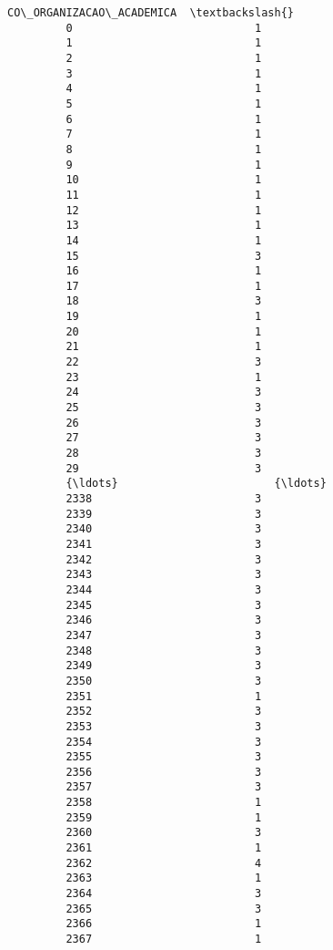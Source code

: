 \documentclass[11pt]{article}
\begin{document}
\begin{Verbatim}[commandchars=\\\{\}]
               CO\_ORGANIZACAO\_ACADEMICA  \textbackslash{}
         0                            1   
         1                            1   
         2                            1   
         3                            1   
         4                            1   
         5                            1   
         6                            1   
         7                            1   
         8                            1   
         9                            1   
         10                           1   
         11                           1   
         12                           1   
         13                           1   
         14                           1   
         15                           3   
         16                           1   
         17                           1   
         18                           3   
         19                           1   
         20                           1   
         21                           1   
         22                           3   
         23                           1   
         24                           3   
         25                           3   
         26                           3   
         27                           3   
         28                           3   
         29                           3   
         {\ldots}                        {\ldots}   
         2338                         3   
         2339                         3   
         2340                         3   
         2341                         3   
         2342                         3   
         2343                         3   
         2344                         3   
         2345                         3   
         2346                         3   
         2347                         3   
         2348                         3   
         2349                         3   
         2350                         3   
         2351                         1   
         2352                         3   
         2353                         3   
         2354                         3   
         2355                         3   
         2356                         3   
         2357                         3   
         2358                         1   
         2359                         1   
         2360                         3   
         2361                         1   
         2362                         4   
         2363                         1   
         2364                         3   
         2365                         3   
         2366                         1   
         2367                         1   
         

\end{Verbatim}
\end{document}
